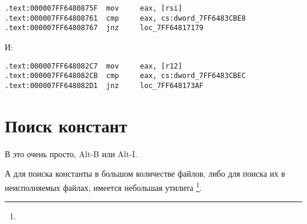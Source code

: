 \begin{lstlisting}[caption=dhcpcore.dll (Windows 7 x64)]
.text:000007FF6480875F  mov     eax, [rsi]
.text:000007FF64808761  cmp     eax, cs:dword_7FF6483CBE8
.text:000007FF64808767  jnz     loc_7FF64817179
\end{lstlisting}

И:

\begin{lstlisting}[caption=dhcpcore.dll (Windows 7 x64)]
.text:000007FF648082C7  mov     eax, [r12]
.text:000007FF648082CB  cmp     eax, cs:dword_7FF6483CBEC
.text:000007FF648082D1  jnz     loc_7FF648173AF
\end{lstlisting}

\section{Поиск констант}

В \IDA это очень просто, Alt-B или Alt-I.

А для поиска константы в большом количестве файлов, либо для поиска их в неисполняемых файлах, имеется небольшая утилита
\footnote{\BGREPURL}.

